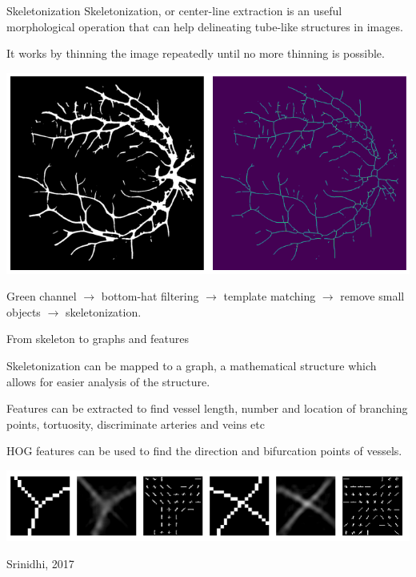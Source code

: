 \documentclass[9pt, aspectratio=169]{beamer}
\begin{document}
\begin{frame}
    {Skeletonization}
    Skeletonization, or center-line extraction is an useful morphological operation that can help delineating tube-like structures in images.

    It works by thinning the image repeatedly until no more thinning is possible.

    \centering
    \includegraphics[width=.8\textwidth]{template_matching and skeleton.png}

    \footnotesize
    Green channel $\rightarrow$ bottom-hat filtering $\rightarrow$ template matching $\rightarrow$ remove small objects $\rightarrow$ skeletonization.
\end{frame}

\begin{frame}
    {From skeleton to graphs and features}

    Skeletonization can be mapped to a graph, a mathematical structure which allows for easier analysis of the structure.

    Features can be extracted to find vessel length, number and location of branching points, tortuosity, discriminate arteries and veins etc

    HOG features can be used to find the direction and bifurcation points of vessels.

    \includegraphics[width=\textwidth]{vesselHOG.png}

    \footnotesize
    Srinidhi, 2017
\end{frame}
\end{document}
